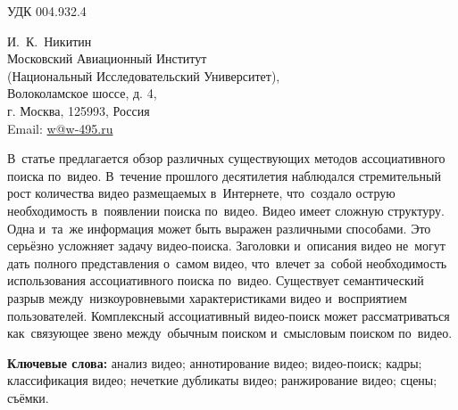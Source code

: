

\noindent УДК 004.932.4


\begin{flushright}
\sf\small
И. К. Никитин \\
Московский Авиационный Институт \\
(Национальный Исследовательский Университет), \\
Волоколамское шоссе, д. 4, \\
г. Москва, 125993, Россия \\
Email: \href{mailto:w@w-495.ru}{w@w-495.ru}
\end{flushright}




В статье предлагается обзор различных существующих методов
ассоциативного поиска по видео.
В течение прошлого десятилетия наблюдался стремительный рост
количества видео размещаемых в Интернете,
что создало острую необходимость в появлении поиска по видео.
Видео имеет сложную структуру. Одна и та же информация
может быть выражен различными способами.
Это серьёзно усложняет задачу видео‑поиска.
Заголовки и описания видео не могут
дать полного представления о самом видео,
что влечет за собой необходимость использования
ассоциативного поиска по видео.
Существует семантический разрыв между низкоуровневыми
характеристиками видео и восприятием пользователей.
Комплексный ассоциативный видео‑поиск
может рассматриваться как связующее звено между обычным поиском
и смысловым поиском по видео.

{\bf Ключевые слова:}
анализ видео;
аннотирование видео;
видео-поиск;
кадры;
классификация видео;
нечеткие дубликаты видео;
ранжирование видео;
сцены;
съёмки.


